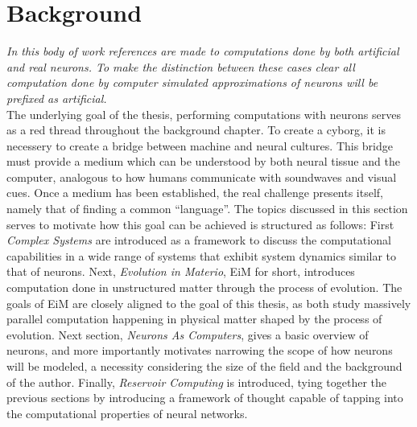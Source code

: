 \chapter{Background}
\emph{
  In this body of work references are made to computations done
  by both artificial and real neurons. To make the distinction
  between these cases clear all computation done by computer
  simulated approximations of neurons will be prefixed as
  artificial.
}\\
The underlying goal of the thesis, performing computations with neurons serves
as a red thread throughout the background chapter.
To create a cyborg, it is necessery to create a bridge between machine and
neural cultures.
This bridge must provide a medium which can be understood by both neural tissue
and the computer, analogous to how humans communicate with soundwaves and visual
cues.
Once a medium has been established, the real challenge presents itself, namely
that of finding a common ``language''.
The topics discussed in this section serves to motivate how this goal can be
achieved is structured as follows:
First \emph{Complex Systems} are introduced as a framework to discuss the computational
capabilities in a wide range of systems that exhibit system dynamics similar to
that of neurons.
Next, \emph{Evolution in Materio}, EiM for short, introduces computation done in
unstructured matter through the process of evolution.
The goals of EiM are closely aligned to the goal of this thesis, as both study
massively parallel computation happening in physical matter shaped by the
process of evolution.
Next section, \emph{Neurons As Computers}, gives a basic overview of neurons,
and more importantly motivates narrowing the scope of how neurons will be
modeled, a necessity considering the size of the field and the background of the author.
Finally, \emph{Reservoir Computing} is introduced, tying together the previous
sections by introducing a framework of thought capable of tapping into the
computational properties of neural networks.

